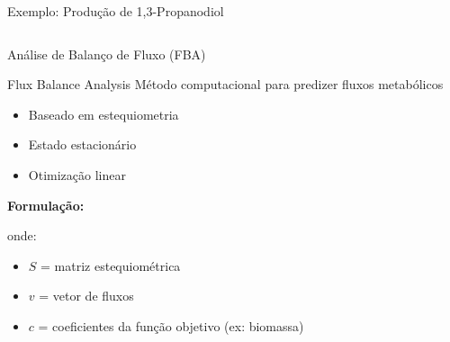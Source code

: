 \begin{frame}{Exemplo: Produção de 1,3-Propanodiol}
\begin{columns}
\begin{center}
\end{center}

\vspace{0.5cm}

\end{columns}
\end{frame}

\begin{frame}{Análise de Balanço de Fluxo (FBA)}
\begin{block}{Flux Balance Analysis}
Método computacional para predizer fluxos metabólicos
\begin{itemize}
    \item Baseado em estequiometria
    \item Estado estacionário
    \item Otimização linear
\end{itemize}
\end{block}

\textbf{Formulação:}

onde:
\begin{itemize}
    \item $S$ = matriz estequiométrica
    \item $v$ = vetor de fluxos
    \item $c$ = coeficientes da função objetivo (ex: biomassa)
\end{itemize}
\end{frame}

